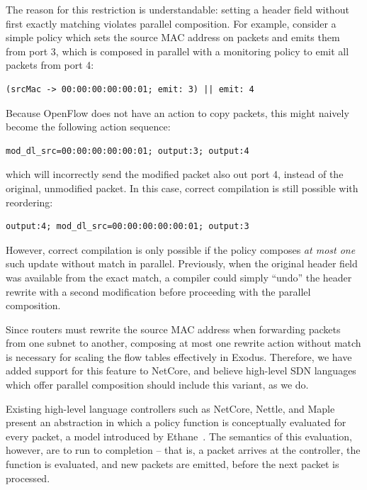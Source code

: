 The reason for this restriction is understandable: setting a header field without
first exactly matching violates parallel composition. For example, consider
a simple policy which sets the source MAC address on packets and emits them
from port 3, which is composed in parallel with a monitoring policy to emit
all packets from port 4:

\begin{small}
\begin{verbatim}
(srcMac -> 00:00:00:00:00:01; emit: 3) || emit: 4
\end{verbatim}
\end{small}
Because OpenFlow does not have an action to copy packets, this might
naively become the following action sequence:

\begin{small}
\begin{verbatim}
mod_dl_src=00:00:00:00:00:01; output:3; output:4
\end{verbatim}
\end{small}
which will incorrectly send the modified packet also out port 4, instead of the original,
unmodified packet. In this case, correct compilation is still possible with reordering:

\begin{small}
\begin{verbatim}
output:4; mod_dl_src=00:00:00:00:00:01; output:3
\end{verbatim}
\end{small}
However, correct compilation is only possible if the policy composes
\emph{at most one} such update without match in parallel. Previously, when the original
header field was available from the exact match, a compiler could simply
``undo'' the header rewrite with a second modification before proceeding with the parallel composition.

Since routers must rewrite the source MAC address when forwarding packets
from one subnet to another, composing at most one rewrite action without match
is necessary for scaling the flow tables effectively in Exodus.
Therefore, we have added support for this feature to NetCore, and believe
high-level SDN languages which offer parallel composition should include this
variant, as we do.

Existing high-level language controllers such as NetCore, Nettle, and Maple present
an abstraction in which a policy function is conceptually evaluated for every packet,
a model introduced by Ethane~\cite{Casado07Ethane}. The semantics of this evaluation,
however, are to run to completion -- that is, a packet arrives at the controller, the
function is evaluated, and new packets are emitted, before the next packet is processed.

